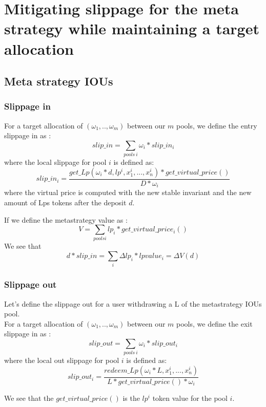 \documentclass[conference]{IEEEtran}
\begin{document}
\section{Mitigating slippage for the meta strategy while maintaining a target allocation}
\subsection{Meta strategy IOUs}
\subsubsection{Slippage in}
For a target allocation of $(\omega_1,..,\omega_m)$ between our $m$ pools, we define the entry slippage in as :
\begin{equation}
slip\_in = \sum_{pools\ i} \omega_i * slip\_in_i
\end{equation}
where the local slippage for pool $i$ is defined as:
\begin{equation}
slip\_in_i = \frac{get\_Lp(\omega_i * d, lp^i, x_1^i, ...,x_n^i) *get\_virtual\_price()}{D*\omega_i}
\end{equation}
where the virtual price is computed with the new stable invariant and the new amount of Lps tokens after the deposit $d$.

If we define the metastrategy value as :
\begin{equation}
V = \sum_{pools i} lp_i * get\_virtual\_price_i()
\end{equation}
We see that 
$$
d * slip\_in =\sum_i \Delta lp_i * lpvalue_i = \Delta V(d)
$$


\subsubsection{Slippage out}
Let's define the slippage out for a user withdrawing a L of the metastrategy IOUs pool.\\
For a target allocation of $(\omega_1,..,\omega_m)$ between our $m$ pools, we define the exit slippage in as :
\begin{equation}
slip\_out = \sum_{pools\ i} \omega_i * slip\_out_i
\end{equation}
where the local out slippage for pool $i$ is defined as:
\begin{equation}
slip\_out_i = \frac{redeem\_Lp(\omega_i * L, x_1^i, ...,x_n^i)}{L*get\_virtual\_price()*\omega_i}
\end{equation}

We see that the $get\_virtual\_price()$ is the $lp^i$ token value for the pool $i$.
\end{document}
